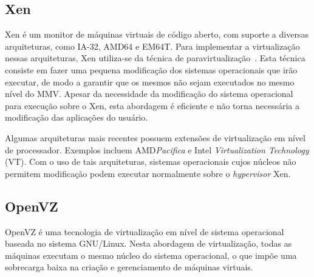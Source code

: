 \documentclass[12pt]{article}
\def\hvisor{\textit{hypervisor}\xspace}
\begin{document}



\subsection{Xen}\label{s:xen}

Xen é um monitor de máquinas virtuais de código aberto, com suporte a diversas arquiteturas, como IA-32, AMD64 e EM64T. Para implementar a virtualização nessas arquiteturas, Xen utiliza-se da técnica de paravirtualização~\cite{youseff2006phs}. Esta técnica consiste em fazer uma pequena modificação dos sistemas operacionais que irão executar, de modo a garantir que os mesmos não sejam executados no mesmo nível do MMV. Apesar da necessidade da modificação do sistema operacional para execução sobre o Xen, esta abordagem é eficiente e não torna necessária a modificação das aplicações do usuário.

Algumas arquiteturas mais recentes possuem extensões de virtualização em nível de processador. Exemplos incluem AMD\textit{Pacifica} e Intel \textit{Virtualization Technology} (VT). Com o uso de tais arquiteturas, sistemas operacionais cujos núcleos não permitem modificação podem executar normalmente sobre o \hvisor Xen.

\subsection{OpenVZ}\label{s:openvz}

OpenVZ é uma tecnologia de virtualização em nível de sistema operacional baseada no sistema GNU/Linux. Nesta abordagem de virtualização, todas as máquinas executam o mesmo núcleo do sistema operacional, o que impõe uma sobrecarga baixa na criação e gerenciamento de máquinas virtuais.
\end{document}
